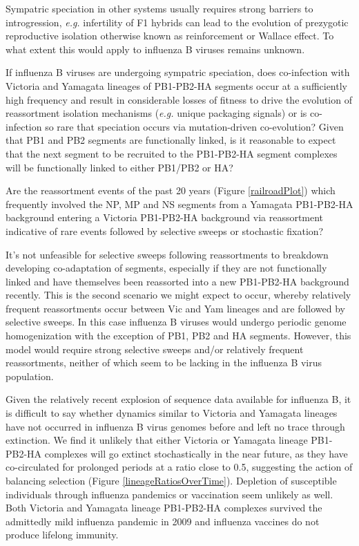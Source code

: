 \documentclass[11pt,oneside,letterpaper]{article}
\begin{document}
Sympatric speciation in other systems usually requires strong barriers to introgression, \textit{e.g.} infertility of F1 hybrids can lead to the evolution of prezygotic reproductive isolation otherwise known as reinforcement or Wallace effect.
To what extent this would apply to influenza B viruses remains unknown.

If influenza B viruses are undergoing sympatric speciation, does co-infection with Victoria and Yamagata lineages of PB1-PB2-HA segments occur at a sufficiently high frequency and result in considerable losses of fitness to drive the evolution of reassortment isolation mechanisms (\textit{e.g.} unique packaging signals) or is co-infection so rare that speciation occurs via mutation-driven co-evolution?
Given that PB1 and PB2 segments are functionally linked, is it reasonable to expect that the next segment to be recruited to the PB1-PB2-HA segment complexes will be functionally linked to either PB1/PB2 or HA?

Are the reassortment events of the past 20 years (Figure \ref{railroadPlot}) which frequently involved the NP, MP and NS segments from a Yamagata PB1-PB2-HA background entering a Victoria PB1-PB2-HA background via reassortment indicative of rare events followed by selective sweeps or stochastic fixation?

It's not unfeasible for selective sweeps following reassortments to breakdown developing co-adaptation of segments, especially if they are not functionally linked and have themselves been reassorted into a new PB1-PB2-HA background recently.
This is the second scenario we might expect to occur, whereby relatively frequent reassortments occur between Vic and Yam lineages and are followed by selective sweeps.
In this case influenza B viruses would undergo periodic genome homogenization with the exception of PB1, PB2 and HA segments.
However, this model would require strong selective sweeps and/or relatively frequent reassortments, neither of which seem to be lacking in the influenza B virus population.

Given the relatively recent explosion of sequence data available for influenza B, it is difficult to say whether dynamics similar to Victoria and Yamagata lineages have not occurred in influenza B virus genomes before and left no trace through extinction.
We find it unlikely that either Victoria or Yamagata lineage PB1-PB2-HA complexes will go extinct stochastically in the near future, as they have co-circulated for prolonged periods at a ratio close to 0.5, suggesting the action of balancing selection (Figure \ref{lineageRatiosOverTime}).
Depletion of susceptible individuals through influenza pandemics or vaccination seem unlikely as well.
Both Victoria and Yamagata lineage PB1-PB2-HA complexes survived the admittedly mild influenza pandemic in 2009 and influenza vaccines do not produce lifelong immunity.
\end{document}
